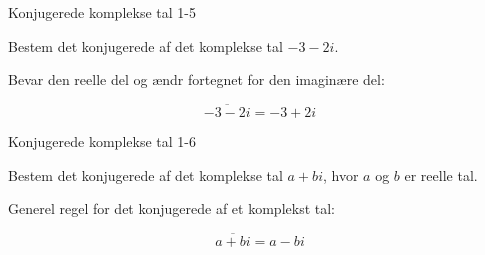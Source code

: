 \documentclass{article}
\begin{document}
\newpage

\begin{exercise}{Konjugerede komplekse tal 1-5}

Bestem det konjugerede af det komplekse tal $-3 - 2i$.


\hint

Bevar den reelle del og ændr fortegnet for den imaginære del:

\hint
\[
\overline{-3 - 2i} = -3 + 2i
\]

\end{exercise}

\newpage

\begin{exercise}{Konjugerede komplekse tal 1-6}

Bestem det konjugerede af det komplekse tal $a + bi$, hvor $a$ og $b$ er reelle tal.


\hint

Generel regel for det konjugerede af et komplekst tal:

\hint
\[
\overline{a + bi} = a - bi
\]

\end{exercise}
\end{document}
